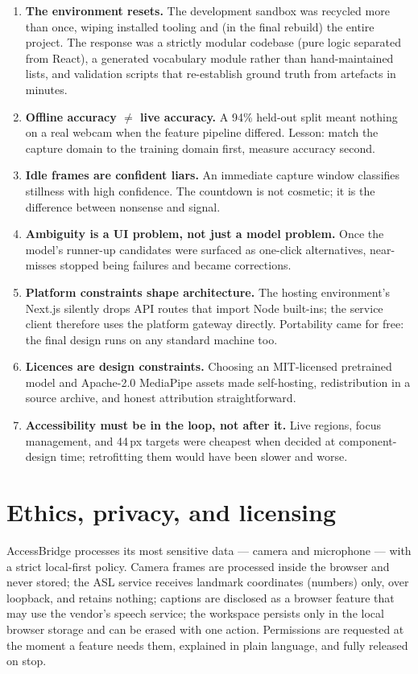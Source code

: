 \documentclass[11pt,a4paper]{article}
\begin{document}
\begin{enumerate}[leftmargin=1.6em, itemsep=4pt]
\item \textbf{The environment resets.} The development sandbox was recycled more than once, wiping installed tooling and (in the final rebuild) the entire project. The response was a strictly modular codebase (pure logic separated from React), a generated vocabulary module rather than hand-maintained lists, and validation scripts that re-establish ground truth from artefacts in minutes.
\item \textbf{Offline accuracy $\neq$ live accuracy.} A 94\% held-out split meant nothing on a real webcam when the feature pipeline differed. Lesson: match the capture domain to the training domain first, measure accuracy second.
\item \textbf{Idle frames are confident liars.} An immediate capture window classifies stillness with high confidence. The countdown is not cosmetic; it is the difference between nonsense and signal.
\item \textbf{Ambiguity is a UI problem, not just a model problem.} Once the model's runner-up candidates were surfaced as one-click alternatives, near-misses stopped being failures and became corrections.
\item \textbf{Platform constraints shape architecture.} The hosting environment's Next.js silently drops API routes that import Node built-ins; the service client therefore uses the platform gateway directly. Portability came for free: the final design runs on any standard machine too.
\item \textbf{Licences are design constraints.} Choosing an MIT-licensed pretrained model and Apache-2.0 MediaPipe assets made self-hosting, redistribution in a source archive, and honest attribution straightforward.
\item \textbf{Accessibility must be in the loop, not after it.} Live regions, focus management, and 44\,px targets were cheapest when decided at component-design time; retrofitting them would have been slower and worse.
\end{enumerate}

\section{Ethics, privacy, and licensing}

AccessBridge processes its most sensitive data --- camera and microphone --- with a strict local-first policy. Camera frames are processed inside the browser and never stored; the ASL service receives landmark coordinates (numbers) only, over loopback, and retains nothing; captions are disclosed as a browser feature that may use the vendor's speech service; the workspace persists only in the local browser storage and can be erased with one action. Permissions are requested at the moment a feature needs them, explained in plain language, and fully released on stop.
\end{document}

